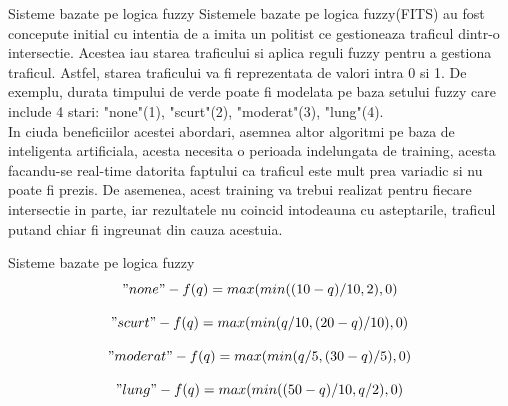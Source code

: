 \documentclass{beamer}
\begin{document}
    \begin{frame}{Sisteme bazate pe logica fuzzy}
        Sistemele bazate pe logica fuzzy(FITS) au fost concepute initial 
        cu intentia de a imita un politist ce gestioneaza traficul dintr-o 
        intersectie. Acestea iau starea traficului si aplica reguli fuzzy 
        pentru a gestiona traficul. Astfel, starea traficului va fi 
        reprezentata de valori intra 0 si 1. De exemplu, durata timpului de 
        verde poate fi modelata pe baza setului fuzzy care include 4 stari:
        "none"(1), "scurt"(2), "moderat"(3), "lung"(4). \\
        In ciuda beneficiilor acestei abordari, asemnea altor algoritmi pe baza 
        de inteligenta artificiala, acesta necesita o perioada indelungata de 
        training, acesta facandu-se real-time datorita faptului ca traficul este 
        mult prea variadic si nu poate fi prezis. De asemenea, acest 
        training va trebui realizat pentru fiecare intersectie in parte, iar 
        rezultatele nu coincid intodeauna cu asteptarile, traficul putand 
        chiar fi ingreunat din cauza acestuia.
    \end{frame}

    \begin{frame}{Sisteme bazate pe logica fuzzy}
        \begin{equation}
            "none" - f(q) = max(min((10 - q) / 10, 2), 0)
        \end{equation}
        
        \begin{equation}
            "scurt" - f(q) = max(min(q / 10, (20 - q) / 10), 0)
        \end{equation}
        
        \begin{equation}
            "moderat" - f(q) = max(min(q / 5, (30 - q) / 5), 0)
        \end{equation}
        
        \begin{equation}
            "lung" - f(q) = max(min((50 - q) / 10, q / 2), 0)
        \end{equation}
    \end{frame}
\end{document}

